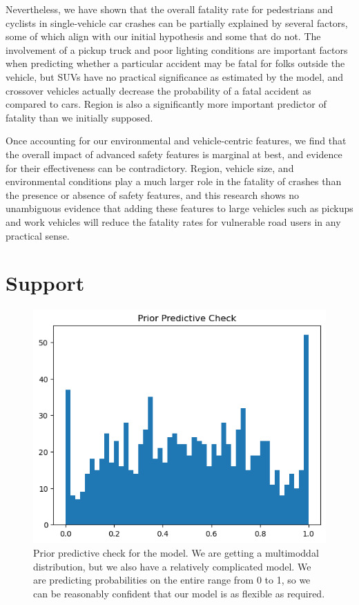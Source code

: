 \documentclass[12pt]{article}
\begin{document}
Nevertheless, we have shown that the overall fatality rate for pedestrians and cyclists in single-vehicle car
crashes can be partially explained by several factors, some of which align with our initial hypothesis and
some that do not. The involvement of a pickup truck and poor lighting conditions are important factors
when predicting whether a particular accident may be fatal for folks outside the vehicle, but SUVs have no practical
significance as estimated by the model, and crossover vehicles actually decrease the probability of a fatal accident
as compared to cars. Region is also a significantly more important predictor of fatality than we initially supposed.

Once accounting for our environmental and vehicle-centric features, we find that the overall impact
of advanced safety features is marginal at best, and evidence for their effectiveness
can be contradictory. Region, vehicle size, and environmental conditions play a much
larger role in the fatality of crashes than the presence or absence of safety features, and this research
shows no unambiguous evidence that adding these features to large vehicles such as pickups
and work vehicles will reduce the fatality rates for vulnerable road users in any practical sense.

\section{Support}

\begin{figure}[h]
    \centering
    \includegraphics[width=\textwidth]{images/prior_predictive_check.png}
    \caption{Prior predictive check for the model. We are getting a multimoddal distribution, but we
        also have a relatively complicated model. We are predicting probabilities on the entire
        range from 0 to 1, so we can be reasonably confident that our model is as flexible as required.}
    \label{fig:ppc}
\end{figure}
\end{document}
